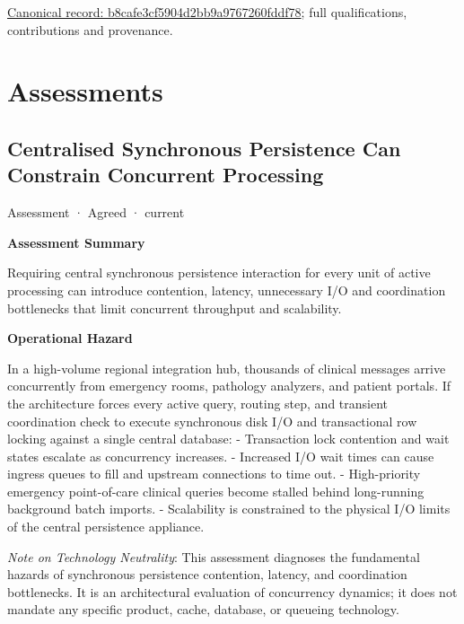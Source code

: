 {\footnotesize \href{../../../../continuum/motivation/principle/b8cafe3cf5904d2bb9a9767260fddf78.md}{Canonical record: b8cafe3cf5904d2bb9a9767260fddf78}; full qualifications, contributions and provenance.}\par
\chapter{Assessments}

\section{Centralised Synchronous Persistence Can Constrain Concurrent Processing}

\label{element:4f7b18cecb08415bad2b4247068a511e}
{\small Assessment · Agreed · current}\par

\par\medskip\textbf{Assessment Summary}\par


Requiring central synchronous persistence interaction for every unit of active processing can introduce contention, latency, unnecessary I/O and coordination bottlenecks that limit concurrent throughput and scalability.



\par\medskip\textbf{Operational Hazard}\par


In a high-volume regional integration hub, thousands of clinical messages arrive concurrently from emergency rooms, pathology analyzers, and patient portals. If the architecture forces every active query, routing step, and transient coordination check to execute synchronous disk I/O and transactional row locking against a single central database:
- Transaction lock contention and wait states escalate as concurrency increases.
- Increased I/O wait times can cause ingress queues to fill and upstream connections to time out.
- High-priority emergency point-of-care clinical queries become stalled behind long-running background batch imports.
- Scalability is constrained to the physical I/O limits of the central persistence appliance.



\emph{Note on Technology Neutrality}: This assessment diagnoses the fundamental hazards of synchronous persistence contention, latency, and coordination bottlenecks. It is an architectural evaluation of concurrency dynamics; it does not mandate any specific product, cache, database, or queueing technology.



